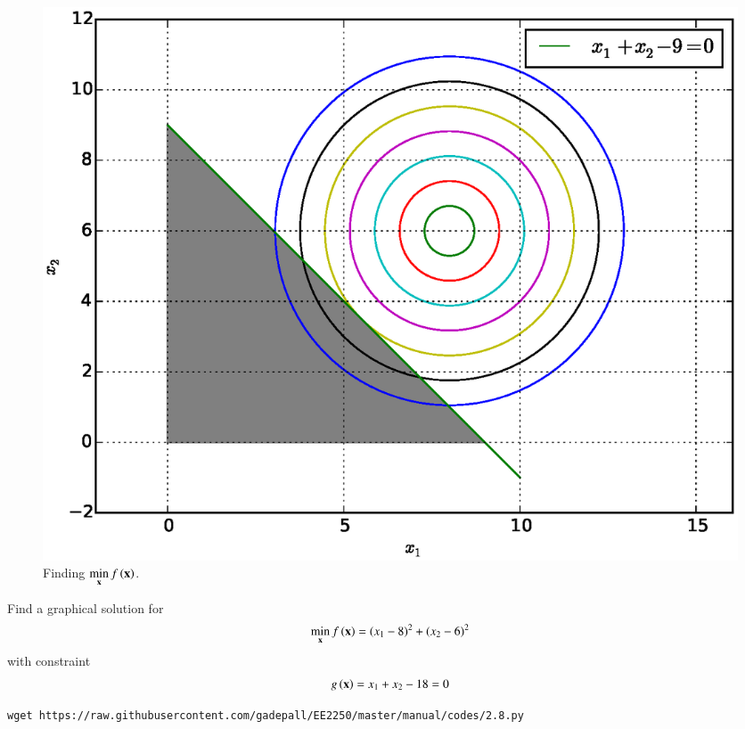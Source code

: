 \documentclass[journal,12pt,twocolumn]{IEEEtran}
\begin{document}
%
\begin{figure}[!ht]
\centering
\includegraphics[width=\columnwidth]{./figs/2.7.eps}
\caption{ Finding $ \displaystyle \min_{\mathbf{x}}f\left(\mathbf{x}\right)$.}
\label{fig.2.7}	
\end{figure}

%
\begin{problem}
\label{ch2_prob_upper}
Find a graphical solution for 	 
	 \begin{align}
	 \label{ch2_second_min}
	\min_{\mathbf{x}} f\left(\mathbf{x}\right) = (x_1-8)^2 + (x_2-6)^2
	 \end{align}
	 with constraint
	 \begin{align}
	 \label{ch2_second_const}
	 g\left(\mathbf{x}\right) = x_1 + x_2 - 18 = 0
	 \end{align}
\end{problem}	 
%
\solution
%	
\begin{lstlisting}
wget https://raw.githubusercontent.com/gadepall/EE2250/master/manual/codes/2.8.py
\end{lstlisting}
\end{document}
